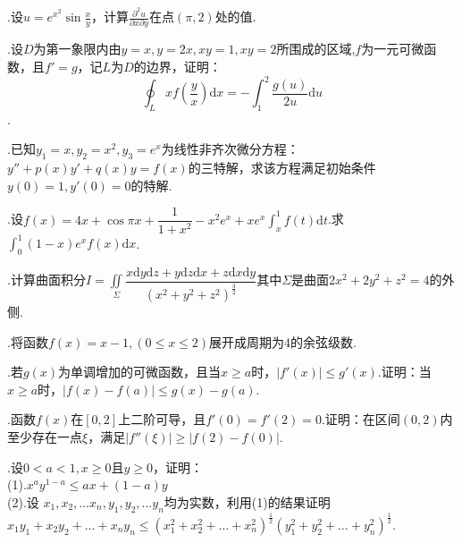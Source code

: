 \documentclass[UTF8]{ctexart}
\begin{document}
.设$u=e^{x^{2}}\sin\frac{x}{y}$，计算$\frac{\partial^{2}u}{\partial x\partial y}$在点$\left(\pi,2\right)$处的值.

.设$D$为第一象限内由$y=x,y=2x,xy=1,xy=2$所围成的区域,$f$为一元可微函数，且$f'=g$，记$L$为$D$的边界，证明：
\[\oint_{L}xf\left(\frac{y}{x}\right)\mathrm{d}x=-\int_{1}^{2}\frac{g\left(u\right)}{2u}\mathrm{d}u\].

.已知$y_{1}=x,y_{2}=x^{2},y_{3}=e^x$为线性非齐次微分方程：$ y''+p(x)y'+q(x)y=f(x) $的三特解，求该方程满足初始条件$ y(0)=1,y'(0)=0 $的特解.

.设$ f(x)=4x+\cos{\pi}{x}+\dfrac{1}{1+x^2}-x^2e^x+xe^x\int_{x}^{1}f(t)\mathrm{d}t $.求$ \int_{0}^{1}(1-x)e^xf(x)\mathrm{d}x $.

.计算曲面积分$ I=\underset{\Sigma}\iint\dfrac{x\mathrm{d}y\mathrm{d}z+y\mathrm{d}z\mathrm{d}x+z\mathrm{d}x\mathrm{d}y}{(x^2+y^2+z^2)^\frac{3}{2}} $其中$ \Sigma $是曲面$ 2x^2+2y^2+z^2=4 $的外侧.

.将函数$ f(x)=x-1,(0\le{x}\le{2}) $展开成周期为$ 4 $的余弦级数.

.若$ g(x) $为单调增加的可微函数，且当$ x\ge{a} $时，$ \left|f'(x)\right|\le{g'(x)} $.证明：当$ x\ge{a} $时，$ \left|f(x)-f(a)\right|\le{g(x)-g(a)} $.

.函数$ f(x) $在$ [0,2] $上二阶可导，且$ f'(0)=f'(2)=0 $.证明：在区间$ (0,2) $内至少存在一点$ \xi $，满足$ \left|f''(\xi)\right|\ge\left|f(2)-f(0)\right| $.

.设$ 0<a<1,x\ge0 $且$ y\ge0 $，证明： \\(1).$x^ay^{1-a}\le{ax+(1-a)y} $\\
(2).设 $x_1,x_2,\ldots x_n,y_1,y_2,\ldots y_n $均为实数，利用(1)的结果证明$ x_1y_1+x_2y_2+\ldots +x_ny_n\le (x_1^2+x_2^2+\ldots+x_n^2)^\frac{1}{2} (y_1^2+y_2^2+\ldots+y_n^2)^\frac{1}{2}$.
\thispagestyle{empty}
\end{document}
